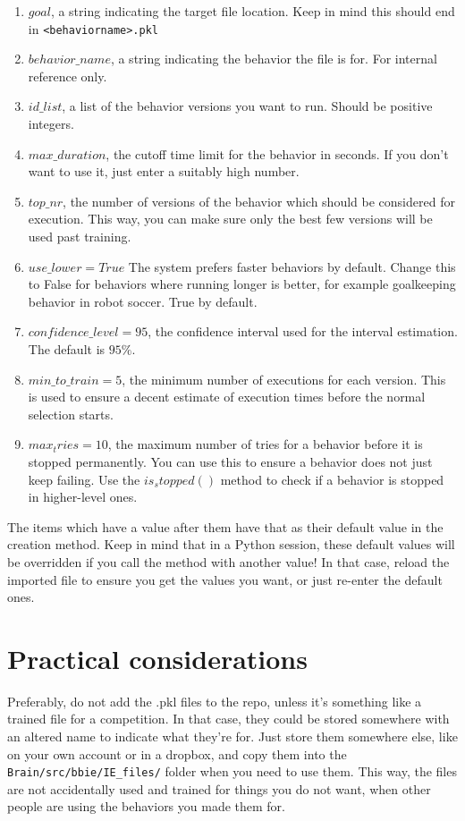 \documentclass[a4paper, 12pt, oneside]{report}
\begin{document}
\begin{enumerate}
\item{$goal$}, a string indicating the target file location. Keep in mind this should end in \verb=<behaviorname>.pkl=
\item{$behavior\_name$}, a string indicating the behavior the file is for. For internal reference only.
\item{$id\_list$}, a list of the behavior versions you want to run. Should be positive integers.
\item{$max\_duration$}, the cutoff time limit for the behavior in seconds. If you don't want to use it, just enter a suitably high number.
\item{$top\_nr$}, the number of versions of the behavior which should be considered for execution.
This way, you can make sure only the best few versions will be used past training.
\item{$use\_lower=True$} The system prefers faster behaviors by default.
Change this to False for behaviors where running longer is better, for example goalkeeping behavior in robot soccer.
True by default.
\item{$confidence\_level=95$}, the confidence interval used for the interval estimation. The default is $95\%$.
\item{$min\_to\_train=5$}, the minimum number of executions for each version.
This is used to ensure a decent estimate of execution times before the normal selection starts.
\item{$max_tries = 10$}, the maximum number of tries for a behavior before it is stopped permanently.
You can use this to ensure a behavior does not just keep failing.
Use the $is_stopped()$ method to check if a behavior is stopped in higher-level ones.
\end{enumerate}

The items which have a value after them have that as their default value in the creation method.
Keep in mind that in a Python session, these default values will be overridden if you call the method with another value!
In that case, reload the imported file to ensure you get the values you want, or just re-enter the default ones.

\section{Practical considerations}

Preferably, do not add the .pkl files to the repo, unless it's something like a trained file for a competition.
In that case, they could be stored somewhere with an altered name to indicate what they're for.
Just store them somewhere else, like on your own account or in a dropbox, and copy them into the \verb=Brain/src/bbie/IE_files/= folder when you need to use them.
This way, the files are not accidentally used and trained for things you do not want, when other people are using the behaviors you made them for.
\end{document}
